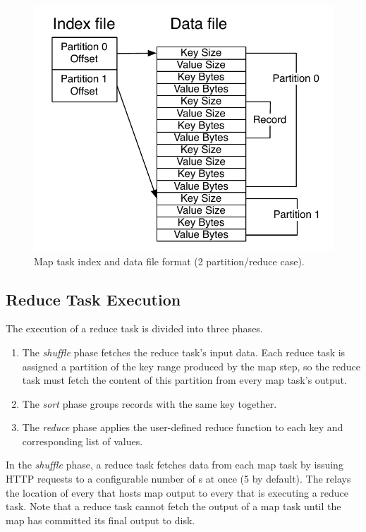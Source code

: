 \begin{figure}[t]
  \ssp
  \centering
  \includegraphics[scale=0.8]{figures/spill_file.pdf}
  \caption{Map task index and data file format (2 partition/reduce case).}
  \label{ch:hadoop:fig:mapoutput}
\end{figure}

\subsection{Reduce Task Execution}
\label{ch:hadoop:sec:reducetask}
The execution of a reduce task is divided into three phases.
\begin{enumerate}
    \ssp
\item The {\em shuffle} phase fetches the reduce task's input
  data. Each reduce task is assigned a partition of the key range
  produced by the map step, so the reduce task must fetch the content
  of this partition from every map task's output.
\item The {\em sort} phase groups records with the same key together.
\item The {\em reduce} phase applies the user-defined reduce function
  to each key and corresponding list of values.
\end{enumerate}

In the {\em shuffle} phase, a reduce task fetches data from each map task by
issuing HTTP requests to a configurable number of {\TT}s at once (5 by
default).  The {\JT} relays the location of every {\TT} that hosts map output
to every {\TT} that is executing a reduce task.  Note that a reduce task cannot
fetch the output of a map task until the map has committed its final output to
disk.

